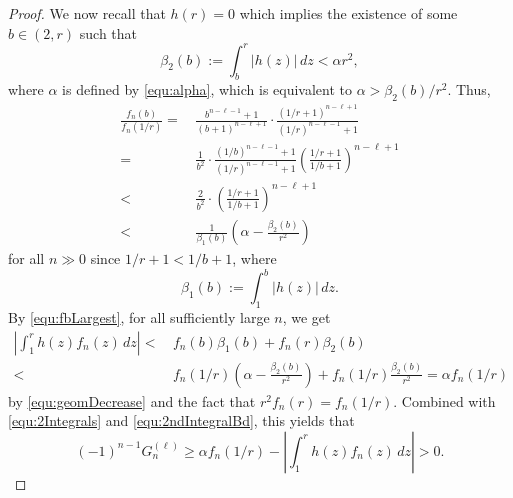 \documentclass[11pt]{article}
\theoremstyle{plain}
\theoremstyle{definition}
\begin{document}
\begin{proof}
We now recall that $h(r)=0$ which implies the existence of some $b\in (2,r)$ such that
\begin{equation*}
\beta_2 (b):= \int_b^r | h(z)| \, dz < \alpha r^2,
\end{equation*}
where $\alpha$ is defined by \eqref{equ:alpha}, which is equivalent to  $\alpha>\beta_2 (b)/r^2$.
Thus,
\begin{align}
\frac {f_n(b)}{f_n(1/r)}=&\, \frac{b^{n-\ell-1}+1}{(b+1)^{n-\ell+1}}\cdot\frac{ (1/r+1)^{n-\ell+1}}{(1/r)^{n-\ell-1}+1}\nonumber\\
=&\, \frac{1}{b^2}  \cdot \frac{(1/b)^{n-\ell-1}+1}{(1/r)^{n-\ell-1}+1} \left(\frac{1/r+1}{1/b+1}\right)^{n-\ell+1}\nonumber\\
<&\,  \frac{2}{b^2}\cdot \left(\frac{1/r+1}{1/b+1}\right)^{n-\ell+1}\nonumber\\
<&\,  \frac{1}{\beta_1 (b)}\left(\alpha-\frac{\beta_2 (b) }{r^2}\right)   \label{equ:geomDecrease}
\end{align}
for all $n\gg 0$ since $1/r+1<1/b+1$, where
\begin{equation*}
\beta_1 (b):= \int_1^b | h(z)| \, dz.
\end{equation*}
By \eqref{equ:fbLargest}, for all sufficiently large $n$, we get
\begin{align*}
\left| \int_1^r h(z) f_n(z)\, dz \right|
< &\,    f_n(b)\beta_1 (b) +  f_n(r)\beta_2 (b) \\
< &\, f_n(1/r) \left(\alpha-\frac{\beta_2 (b)}{r^2} \right)+  f_n(1/r) \frac{\beta_2 (b)}{r^2}
=\alpha f_n(1/r)
\end{align*}
by \eqref{equ:geomDecrease} and the fact that $r^2f_n(r) =f_n(1/r)$.
Combined with \eqref{equ:2Integrals} and \eqref{equ:2ndIntegralBd}, this yields that
\begin{equation}\label{equ:goal}
(-1)^{n-1} G_n^{(\ell)} \ge \alpha f_n(1/r)- \left| \int_1^r h(z) f_n(z)\, dz \right|>0.
\end{equation}



\end{proof}
\end{document}
